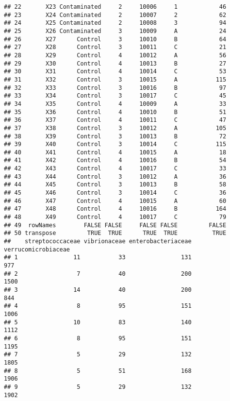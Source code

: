 \documentclass[12pt]{beamer}\usepackage[]{graphicx}\usepackage[]{color}
\makeatletter
\newenvironment{kframe}{%
 \def\at@end@of@kframe{}%
 \ifinner\ifhmode%
  \def\at@end@of@kframe{\end{minipage}}%
  \begin{minipage}{\columnwidth}%
 \fi\fi%
 \def\FrameCommand##1{\hskip\@totalleftmargin \hskip-\fboxsep
 \colorbox{shadecolor}{##1}\hskip-\fboxsep
     \hskip-\linewidth \hskip-\@totalleftmargin \hskip\columnwidth}%
 \MakeFramed {\advance\hsize-\width
   \@totalleftmargin\z@ \linewidth\hsize
   \@setminipage}}%
 {\par\unskip\endMakeFramed%
 \at@end@of@kframe}
\newenvironment{knitrout}{}{} %
\makeatother
\begin{document}
\begin{frame}[fragile]
\begin{knitrout}
\begin{kframe}
\begin{verbatim}
## 22       X23 Contaminated     2     10006     1            46
## 23       X24 Contaminated     2     10007     2            62
## 24       X25 Contaminated     2     10008     3            94
## 25       X26 Contaminated     3     10009     A            24
## 26       X27      Control     3     10010     B            64
## 27       X28      Control     3     10011     C            21
## 28       X29      Control     4     10012     A            56
## 29       X30      Control     4     10013     B            27
## 30       X31      Control     4     10014     C            53
## 31       X32      Control     3     10015     A           115
## 32       X33      Control     3     10016     B            97
## 33       X34      Control     3     10017     C            45
## 34       X35      Control     4     10009     A            33
## 35       X36      Control     4     10010     B            51
## 36       X37      Control     4     10011     C            47
## 37       X38      Control     3     10012     A           105
## 38       X39      Control     3     10013     B            72
## 39       X40      Control     3     10014     C           115
## 40       X41      Control     4     10015     A            18
## 41       X42      Control     4     10016     B            54
## 42       X43      Control     4     10017     C            33
## 43       X44      Control     3     10012     A            36
## 44       X45      Control     3     10013     B            58
## 45       X46      Control     3     10014     C            36
## 46       X47      Control     4     10015     A            60
## 47       X48      Control     4     10016     B           164
## 48       X49      Control     4     10017     C            79
## 49  rowNames        FALSE FALSE     FALSE FALSE         FALSE
## 50 transpose         TRUE  TRUE      TRUE  TRUE          TRUE
##    streptococcaceae vibrionaceae enterobacteriaceae verrucomicrobiaceae
## 1                11           33                131                 977
## 2                 7           40                200                1500
## 3                14           40                200                 844
## 4                 8           95                151                1006
## 5                10           83                140                1112
## 6                 8           95                151                1195
## 7                 5           29                132                1805
## 8                 5           51                168                1906
## 9                 5           29                132                1902

\end{verbatim}
\end{kframe}
\end{knitrout}
\end{frame}
\end{document}
